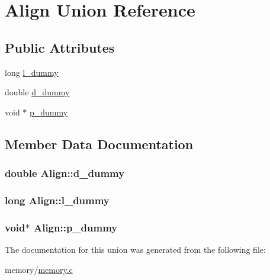 \hypertarget{union_align}{}\section{Align Union Reference}
\label{union_align}
\subsection*{Public Attributes}
\begin{DoxyCompactItemize}
\item 
long \hyperlink{union_align_a2ae3cf5e2981d94d7a110fd21d422bdd}{l\+\_\+dummy}
\item 
double \hyperlink{union_align_a4748f292316c6d230c6ba2decce0d6d5}{d\+\_\+dummy}
\item 
void $\ast$ \hyperlink{union_align_ad31def7be501a6c17d6a4e1fceaf17ef}{p\+\_\+dummy}
\end{DoxyCompactItemize}


\subsection{Member Data Documentation}
\hypertarget{union_align_a4748f292316c6d230c6ba2decce0d6d5}{}
\subsubsection[{d\+\_\+dummy}]{\setlength{\rightskip}{0pt plus 5cm}double Align\+::d\+\_\+dummy}\label{union_align_a4748f292316c6d230c6ba2decce0d6d5}
\hypertarget{union_align_a2ae3cf5e2981d94d7a110fd21d422bdd}{}
\subsubsection[{l\+\_\+dummy}]{\setlength{\rightskip}{0pt plus 5cm}long Align\+::l\+\_\+dummy}\label{union_align_a2ae3cf5e2981d94d7a110fd21d422bdd}
\hypertarget{union_align_ad31def7be501a6c17d6a4e1fceaf17ef}{}
\subsubsection[{p\+\_\+dummy}]{\setlength{\rightskip}{0pt plus 5cm}void$\ast$ Align\+::p\+\_\+dummy}\label{union_align_ad31def7be501a6c17d6a4e1fceaf17ef}


The documentation for this union was generated from the following file\+:\begin{DoxyCompactItemize}
\item 
memory/\hyperlink{memory_8c}{memory.\+c}\end{DoxyCompactItemize}
